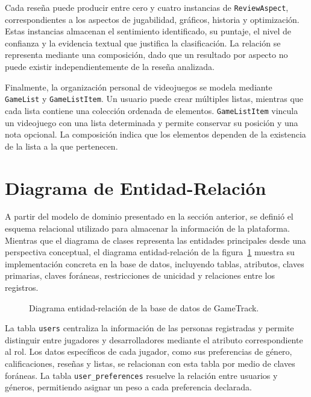Cada reseña puede producir entre cero y cuatro instancias de \texttt{ReviewAspect}, correspondientes a los aspectos de jugabilidad, gráficos, historia y optimización. Estas instancias almacenan el sentimiento identificado, su puntaje, el nivel de confianza y la evidencia textual que justifica la clasificación. La relación se representa mediante una composición, dado que un resultado por aspecto no puede existir independientemente de la reseña analizada.

Finalmente, la organización personal de videojuegos se modela mediante \texttt{GameList} y \texttt{GameListItem}. Un usuario puede crear múltiples listas, mientras que cada lista contiene una colección ordenada de elementos. \texttt{GameListItem} vincula un videojuego con una lista determinada y permite conservar su posición y una nota opcional. La composición indica que los elementos dependen de la existencia de la lista a la que pertenecen.

\section{Diagrama de Entidad-Relación}\label{sec:diagrama_er}

A partir del modelo de dominio presentado en la sección anterior, se definió el esquema relacional utilizado para almacenar la información de la plataforma. Mientras que el diagrama de clases representa las entidades principales desde una perspectiva conceptual, el diagrama entidad-relación de la figura~\ref{fig:diagrama_er} muestra su implementación concreta en la base de datos, incluyendo tablas, atributos, claves primarias, claves foráneas, restricciones de unicidad y relaciones entre los registros.

\begin{landscape}
\begin{figure}[H]
	\centering
	\caption{Diagrama entidad-relación de la base de datos de GameTrack.}
	\label{fig:diagrama_er}
\end{figure}
\end{landscape}

La tabla \texttt{users} centraliza la información de las personas registradas y permite distinguir entre jugadores y desarrolladores mediante el atributo correspondiente al rol. Los datos específicos de cada jugador, como sus preferencias de género, calificaciones, reseñas y listas, se relacionan con esta tabla por medio de claves foráneas. La tabla \texttt{user\_preferences} resuelve la relación entre usuarios y géneros, permitiendo asignar un peso a cada preferencia declarada.

